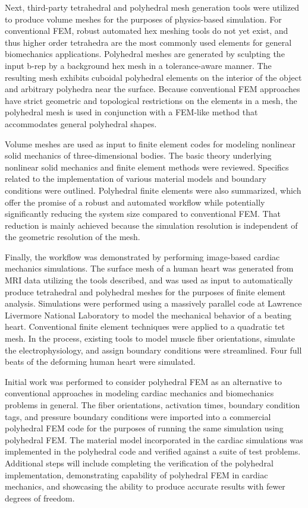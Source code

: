 Next, third-party tetrahedral and polyhedral mesh generation tools were utilized to produce volume meshes for the purposes of physics-based simulation. For conventional FEM, robust automated hex meshing tools do not yet exist, and thus higher order tetrahedra are the most commonly used elements for general biomechanics applications. Polyhedral meshes are generated by sculpting the input b-rep by a background hex mesh in a tolerance-aware manner. The resulting mesh exhibits cuboidal polyhedral elements on the interior of the object and arbitrary polyhedra near the surface. Because conventional FEM approaches have strict geometric and topological restrictions on the elements in a mesh, the polyhedral mesh is used in conjunction with a FEM-like method that accommodates general polyhedral shapes.

Volume meshes are used as input to finite element codes for modeling  nonlinear solid mechanics of three-dimensional bodies. The basic theory underlying nonlinear solid mechanics and finite element methods were reviewed. Specifics related to the implementation of various material models and boundary conditions were outlined. Polyhedral finite elements were also summarized, which offer the promise of a robust and automated workflow while potentially significantly reducing the system size compared to conventional FEM. That reduction is mainly achieved because the simulation resolution is independent of the geometric resolution of the mesh.

Finally, the workflow was demonstrated by performing image-based cardiac mechanics simulations. The surface mesh of a human heart was generated from MRI data utilizing the tools described, and was used as input to automatically produce tetrahedral and polyhedral meshes for the purposes of finite element analysis. Simulations were performed using a massively parallel code at Lawrence Livermore National Laboratory to model the mechanical behavior of a beating heart. Conventional finite element techniques were applied to a quadratic tet mesh. In the process, existing tools to model muscle fiber orientations, simulate the electrophysiology, and assign boundary conditions were streamlined. Four full beats of the deforming human heart were simulated.

Initial work was performed to consider polyhedral FEM as an alternative to conventional approaches in modeling cardiac mechanics and biomechanics problems in general. The fiber orientations, activation times, boundary condition tags, and pressure boundary conditions were imported into a commercial polyhedral FEM code for the purposes of running the same simulation using polyhedral FEM. The material model incorporated in the cardiac simulations was implemented in the polyhedral code and verified against a suite of test problems. Additional steps will include completing the verification of the polyhedral implementation, demonstrating capability of polyhedral FEM in cardiac mechanics, and showcasing the ability to produce accurate results with fewer degrees of freedom.

